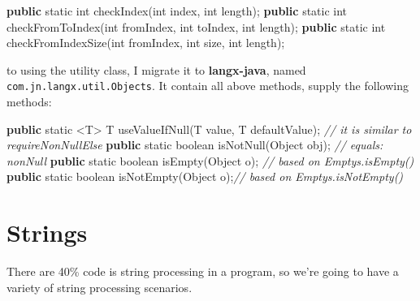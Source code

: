 \documentclass[
]{book}
\newenvironment{Shaded}{\begin{snugshade}}{\end{snugshade}}
\newcommand{\BuiltInTok}[1]{#1}
\newcommand{\CommentTok}[1]{\textcolor[rgb]{0.56,0.35,0.01}{\textit{#1}}}
\newcommand{\DataTypeTok}[1]{\textcolor[rgb]{0.13,0.29,0.53}{#1}}
\newcommand{\FunctionTok}[1]{\textcolor[rgb]{0.00,0.00,0.00}{#1}}
\newcommand{\KeywordTok}[1]{\textcolor[rgb]{0.13,0.29,0.53}{\textbf{#1}}}
\newcommand{\NormalTok}[1]{#1}
\begin{document}
\begin{Shaded}
\begin{Highlighting}[]
\KeywordTok{public} \DataTypeTok{static} \DataTypeTok{int} \FunctionTok{checkIndex}\NormalTok{(}\DataTypeTok{int}\NormalTok{ index, }\DataTypeTok{int}\NormalTok{ length);}
\KeywordTok{public} \DataTypeTok{static} \DataTypeTok{int} \FunctionTok{checkFromToIndex}\NormalTok{(}\DataTypeTok{int}\NormalTok{ fromIndex, }\DataTypeTok{int}\NormalTok{ toIndex, }\DataTypeTok{int}\NormalTok{ length);}
\KeywordTok{public} \DataTypeTok{static} \DataTypeTok{int} \FunctionTok{checkFromIndexSize}\NormalTok{(}\DataTypeTok{int}\NormalTok{ fromIndex, }\DataTypeTok{int}\NormalTok{ size, }\DataTypeTok{int}\NormalTok{ length);}
\end{Highlighting}
\end{Shaded}

to using the utility class, I migrate it to \textbf{langx-java}, named \texttt{com.jn.langx.util.Objects}. It contain all above methods, supply the following methods:

\begin{Shaded}
\begin{Highlighting}[]
\KeywordTok{public} \DataTypeTok{static}\NormalTok{ <T> T }\FunctionTok{useValueIfNull}\NormalTok{(T value, T defaultValue); }\CommentTok{// it is similar to requireNonNullElse}
\KeywordTok{public} \DataTypeTok{static} \DataTypeTok{boolean} \FunctionTok{isNotNull}\NormalTok{(}\BuiltInTok{Object}\NormalTok{ obj); }\CommentTok{// equals: nonNull}
\KeywordTok{public} \DataTypeTok{static} \DataTypeTok{boolean} \FunctionTok{isEmpty}\NormalTok{(}\BuiltInTok{Object}\NormalTok{ o); }\CommentTok{// based on Emptys.isEmpty()}
\KeywordTok{public} \DataTypeTok{static} \DataTypeTok{boolean} \FunctionTok{isNotEmpty}\NormalTok{(}\BuiltInTok{Object}\NormalTok{ o);}\CommentTok{// based on Emptys.isNotEmpty()}
\end{Highlighting}
\end{Shaded}

\hypertarget{langx-java_references_utils_Strings}{%
\section{Strings}\label{langx-java_references_utils_Strings}}

There are 40\% code is string processing in a program, so we're going to have a variety of string processing scenarios.
\end{document}
